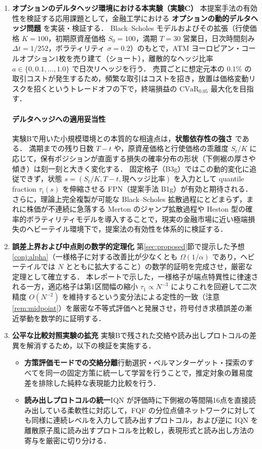 \documentclass[a4paper,10pt]{jsarticle}
\theoremstyle{definition}
\newcommand{\CVaR}{\mathrm{CVaR}}
\begin{document}
\begin{enumerate}
  \item \textbf{オプションのデルタヘッジ環境における本実験（実験C）}\quad
  本提案手法の有効性を検証する応用課題として，金融工学における \textbf{オプションの動的デルタヘッジ問題} \cite{cao2021deep,cao2023gamma} を実装・検証する．
  Black--Scholes モデルおよびその拡張（行使価格 $K=100$，初期原資産価格 $S_0=100$，満期 $T=30$ 営業日，日次時間刻み $\Delta t = 1/252$，ボラティリティ $\sigma=0.2$）のもとで，ATM ヨーロピアン・コールオプション1枚を売り建て（ショート），離散的なヘッジ比率 $a \in \{0, 0.1, \dots, 1.0\}$ で日次リヘッジを行う．
  売買ごとに想定元本の $0.1\%$ の取引コストが発生するため，頻繁な取引はコストを招き，放置は価格変動リスクを招くというトレードオフの下で，終端損益の $\CVaR_{0.05}$ 最大化を目指す．

  \paragraph{デルタヘッジへの適用妥当性}
  実験Bで用いた小規模環境との本質的な相違点は，\textbf{状態依存性の強さ} である．
  満期までの残り日数 $T-t$ や，原資産価格と行使価格の乖離度 $S_t/K$ に応じて，保有ポジションが直面する損失の確率分布の形状（下側裾の厚さや傾き）は刻一刻と大きく変化する．
  固定格子（B3g）ではこの動的変化に追従できず，状態 $s = (S_t/K, T-t, \text{現ヘッジ比率})$ を入力として quantile fraction $\tau_i(s)$ を伸縮させる FPN（提案手法 B1g）が有効と期待される．
  さらに，理論上完全複製が可能な Black--Scholes 拡散過程にとどまらず，まれに株価が不連続に急落する Merton のジャンプ拡散過程や Heston 型の確率的ボラティリティモデルを導入することで，現実の金融市場に近い極端損失のヘビーテイル環境下で，提案法の有効性を体系的に検証する．

  \item \textbf{誤差上界および中点則の数学的定理化}\quad
  第\ref{sec:proposed}節で提示した予想\ref{conj:alpha}（一様格子に対する改善比が少なくとも $\Omega(1/\alpha)$ であり，ヘビーテイルでは $N$ とともに拡大すること）の数学的証明を完成させ，厳密な定理として確立する．
  本レポートで示した，一様格子が端点特異性に律速される一方，適応格子は第1区間幅の縮小 $\tau_1 \propto N^{-3}$ によりこれを回避して二次精度 $O(N^{-2})$ を維持するという変分法による定性的一致（注意\ref{rem:midpoint}）を厳密な不等式評価へと発展させ，符号付き求積誤差の漸近挙動を数学的に証明する．

  \item \textbf{公平な比較対照実験の拡充}\quad
  実験Bで残された交絡や読み出しプロトコルの差異を解消するため，以下の検証を実施する．
  \begin{itemize}
    \item \textbf{方策評価モードでの交絡分離}\quad 行動選択・ベルマンターゲット・探索のすべてを同一の固定方策に統一して学習を行うことで，推定対象の難易度差を排除した純粋な表現能力比較を行う．
    \item \textbf{読み出しプロトコルの統一}\quad IQN が評価時に下側裾の等間隔16点を直接読み出している柔軟性に対応して，FQF の分位点値ネットワークに対しても同様に連続レベルを入力して読み出すプロトコル，および逆に IQN を離散原子風に読み出すプロトコルを比較し，表現形式と読み出し方法の寄与を厳密に切り分ける．
  \end{itemize}


\end{enumerate}
\end{document}
